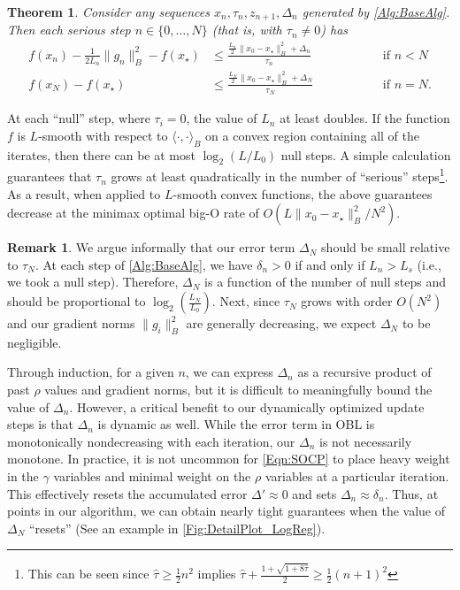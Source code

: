 \documentclass[11pt]{article}
\numberwithin{equation}{section}
\newtheorem{theorem}[thm]{Theorem}
\newcommand{\Ucoef}{\rho}
\newcommand{\Wcoef}{\gamma}
\newcommand{\idxLastSuccess}{s}
\newcommand{\normB}[1]{\|{#1}\|_B}
\theoremstyle{definition}
\newtheorem{remark}{Remark}
\theoremstyle{plain}
\theoremstyle{definition}
\begin{document}
\begin{theorem} \label{Thm:ConvRate}
    Consider any sequences $x_n, \tau_n, z_{n+1}, \Delta_n$ generated by \cref{Alg:BaseAlg}. 
    Then each serious step $n\in\{0,\dots, N\}$ (that is, with $\tau_n\neq 0$) has
    \begin{align} 
        f(x_n) -\frac{1}{2L_n}\|g_n\|^2_B - f(x_\star) &\leq \frac{\frac{L_n}{2} \|x_0 - x_\star\|^2_B + \Delta_n}{ \tau_n} \qquad\qquad &&\text{if\ } n <N \label{Eqn:ConvRate}\\
        f(x_N) - f(x_\star) &\leq \frac{\frac{L_N}{2} \|x_0 - x_\star\|^2_B + \Delta_N}{ \tau_N} \qquad\qquad &&\text{if\ } n=N. \label{Eqn:ConvRateN}
    \end{align}
\end{theorem}
At each ``null'' step, where $\tau_i=0$, the value of $L_n$ at least doubles. If the function $f$ is $L$-smooth with respect to $\langle \cdot,\cdot\rangle_B$ on a convex region containing all of the iterates, then there can be at most $\log_2(L/L_0)$ null steps. A simple calculation guarantees that $\tau_n$ grows at least quadratically in the number of ``serious'' steps\footnote{This can be seen since $\hat{\tau} \geq \frac{1}{2}n^2$ implies $\hat{\tau} + \frac{1+\sqrt{1+8\hat{\tau}}}{2} \geq \frac{1}{2}(n+1)^2$}. As a result, when applied to $L$-smooth convex functions, the above guarantees decrease at the minimax optimal big-O rate of $O(L\|x_0-x_\star\|^2_B/N^2)$.

\begin{remark} \label{Rem:DeltaN}
    We argue informally that our error term $\Delta_N$ should be small relative to $\tau_N$. At each step of \cref{Alg:BaseAlg}, we have $\delta_n > 0$ if and only if $L_n > L_\idxLastSuccess$ (i.e., we took a null step). Therefore, $\Delta_N$ is a function of the number of null steps and should be proportional to $\log_2(\frac{L_N}{L_0})$. Next, since $\tau_N$ grows with order $O(N^2)$ and our gradient norms $\normB{g_i}^2$ are generally decreasing, we expect $\Delta_N$ to be negligible.
    
    Through induction, for a given $n$, we can express $\Delta_n$ as a recursive product of past $\Ucoef$ values and gradient norms, but it is difficult to meaningfully bound the value of $\Delta_n$. However, a critical benefit to our dynamically optimized update steps is that $\Delta_n$ is dynamic as well. While the error term in OBL is monotonically nondecreasing with each iteration, our $\Delta_n$ is not necessarily monotone. In practice, it is not uncommon for \eqref{Eqn:SOCP} to place heavy weight in the $\Wcoef$ variables and minimal weight on the $\Ucoef$ variables at a particular iteration. This effectively resets the accumulated error $\Delta' \approx 0$ and sets $\Delta_n \approx \delta_n$. Thus, at points in our algorithm, we can obtain nearly tight guarantees when the value of $\Delta_N$ ``resets'' (See an example in \cref{Fig:DetailPlot_LogReg}).
\end{remark}
\end{document}
